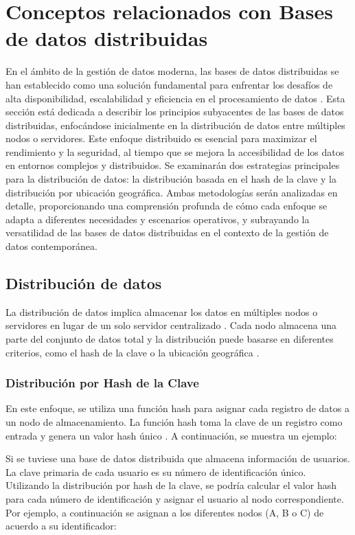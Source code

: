 \section{Conceptos relacionados con Bases de datos distribuidas}
\noindent
En el ámbito de la gestión de datos moderna, las bases de datos distribuidas se han establecido como una solución fundamental para enfrentar los desafíos de alta disponibilidad, escalabilidad y eficiencia en el procesamiento de datos \cite{Liu2017BigData}. Esta sección está dedicada a describir los principios subyacentes de las bases de datos distribuidas, enfocándose inicialmente en la distribución de datos entre múltiples nodos o servidores. Este enfoque distribuido es esencial para maximizar el rendimiento y la seguridad, al tiempo que se mejora la accesibilidad de los datos en entornos complejos y distribuidos. Se examinarán dos estrategias principales para la distribución de datos: la distribución basada en el hash de la clave y la distribución por ubicación geográfica. Ambas metodologías serán analizadas en detalle, proporcionando una comprensión profunda de cómo cada enfoque se adapta a diferentes necesidades y escenarios operativos, y subrayando la versatilidad de las bases de datos distribuidas en el contexto de la gestión de datos contemporánea.

\subsection{Distribución de datos}
\noindent
La distribución de datos implica almacenar los datos en múltiples nodos o servidores en lugar de un solo servidor centralizado \cite{Venugopal2006ATaxonomy}. Cada nodo almacena una parte del conjunto de datos total y la distribución puede basarse en diferentes criterios, como el hash de la clave o la ubicación geográfica \cite{Ratnasamy2002GHT,Ratnasamy2003DataCentric}.

\subsubsection{Distribución por Hash de la Clave}
\noindent
En este enfoque, se utiliza una función hash para asignar cada registro de datos a un nodo de almacenamiento. La función hash toma la clave de un registro como entrada y genera un valor hash único \cite{Camenisch2019Oblivious,Carter1977Universal,Taranov2022Data}. A continuación, se muestra un ejemplo:

Si se tuviese una base de datos distribuida que almacena información de usuarios. La clave primaria de cada usuario es su número de identificación único. Utilizando la distribución por hash de la clave, se podría calcular el valor hash para cada número de identificación y asignar el usuario al nodo correspondiente. Por ejemplo, a continuación se asignan a los diferentes nodos (A, B o C) de acuerdo a su identificador:

